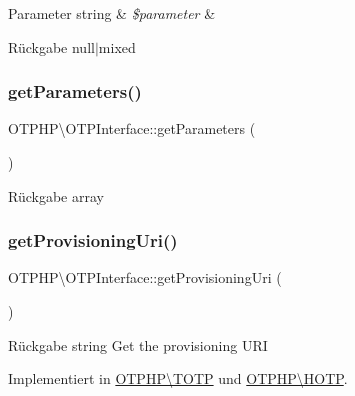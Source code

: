 \begin{DoxyParams}[1]{Parameter}
string & {\em \$parameter} & \\
\hline
\end{DoxyParams}
\begin{DoxyReturn}{Rückgabe}
null$\vert$mixed 
\end{DoxyReturn}
\mbox{\label{interface_o_t_p_h_p_1_1_o_t_p_interface_ac3b54b7ec1201cda34eafe25ecc8fa47}} 
\subsubsection{\texorpdfstring{get\+Parameters()}{getParameters()}}
{\footnotesize\ttfamily O\+T\+P\+H\+P\textbackslash{}\+O\+T\+P\+Interface\+::get\+Parameters (\begin{DoxyParamCaption}{ }\end{DoxyParamCaption})}

\begin{DoxyReturn}{Rückgabe}
array 
\end{DoxyReturn}
\mbox{\label{interface_o_t_p_h_p_1_1_o_t_p_interface_a6e8f0a0c2f1c3ec16426a80fc9610089}} 
\subsubsection{\texorpdfstring{get\+Provisioning\+Uri()}{getProvisioningUri()}}
{\footnotesize\ttfamily O\+T\+P\+H\+P\textbackslash{}\+O\+T\+P\+Interface\+::get\+Provisioning\+Uri (\begin{DoxyParamCaption}{ }\end{DoxyParamCaption})}

\begin{DoxyReturn}{Rückgabe}
string Get the provisioning U\+RI 
\end{DoxyReturn}


Implementiert in \mbox{\hyperlink{class_o_t_p_h_p_1_1_t_o_t_p_a85b294664fda16d6b87d80e645714ed0}{O\+T\+P\+H\+P\textbackslash{}\+T\+O\+TP}} und \mbox{\hyperlink{class_o_t_p_h_p_1_1_h_o_t_p_a468b545132d70bd82e48806243bd2269}{O\+T\+P\+H\+P\textbackslash{}\+H\+O\+TP}}.

